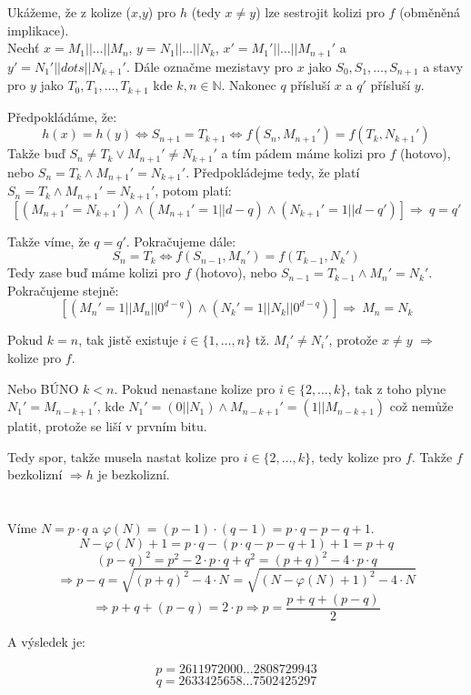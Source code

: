 \documentclass[12pt, a4paper]{article}
\begin{document}
\section{}
Ukážeme, že z kolize ($x$,$y$)  pro $h$ (tedy $x\neq y$) lze sestrojit kolizi pro $f$ (obměněná implikace).\\
Nechť $x = M_1||\dots||M_n$, $y = N_1||\dots||N_k$, $x' = M_1'||\dots||M_{n+1}'$ a $y' = N_1'||dots||N_{k+1}'$. Dále označme mezistavy pro $x$ jako $S_0, S_1, \dots, S_{n+1}$ a stavy pro $y$ jako $T_0, T_1, \dots, T_{k+1}$ kde $k,n \in \mathbb{N}$. Nakonec $q$ přísluší $x$ a $q'$ přísluší $y$. 

Předpokládáme, že: 
\[h(x)=h(y) \iff S_{n+1} = T_{k+1} \iff f(S_n, M_{n+1}') = f(T_k, N_{k+1}')\]
Takže buď $S_n \neq T_k \lor M_{n+1}' \neq N_{k+1}'$ a tím pádem máme kolizi pro $f$ (hotovo), nebo $S_n = T_k \land M_{n+1}' = N_{k+1}'$. Předpokládejme tedy, že platí $S_n = T_k \land M_{n+1}' = N_{k+1}'$, potom platí:
\[ [(M_{n+1}' = N_{k+1}') \land (M_{n+1}'=1||d-q) \land (N_{k+1}'=1||d-q')] \Rightarrow\ q=q'\]

Takže víme, že $q=q'$. Pokračujeme dále: 
\[S_n = T_k \iff f(S_{n-1}, M_n') = f(T_{k-1}, N_k')\]
Tedy zase buď máme kolizi pro $f$ (hotovo), nebo $S_{n-1} = T_{k-1} \land M_n' = N_k'$. Pokračujeme stejně:
\[[(M_n'=1||M_n||0^{d-q}) \land (N_k'=1||N_k||0^{d-q})] \Rightarrow\ M_n=N_k\]

Pokud $k=n$, tak jistě existuje $i \in \{1, \dots, n\}$ tž. $M_i' \neq N_i'$, protože $x \neq y$ $\Rightarrow$ kolize pro $f$.

Nebo BÚNO $k < n$. Pokud nenastane kolize pro $i \in \{2, \dots, k\}$, tak z toho plyne $N_1' = M_{n-k+1}'$, kde $N_1' = (0 || N_1) \land M_{n-k+1}'=(1||M_{n-k+1})$ což nemůže platit, protože se liší v prvním bitu. 

Tedy spor, takže musela nastat kolize pro $i\in\{2, \dots, k\}$, tedy kolize pro $f$. Takže $f$ bezkolizní $\Rightarrow h$ je bezkolizní.

\section{}
Víme $N = p \cdot q$ a $\varphi(N)=(p-1)\cdot(q-1)=p \cdot q - p - q + 1$.
\[N - \varphi(N) + 1 = p \cdot q - (p \cdot q - p - q + 1) + 1 = p + q \]
\[(p-q)^2 = p^2-2\cdot p \cdot q + q^2 = (p+q)^2 - 4\cdot p \cdot q \]
\[\Rightarrow p-q = \sqrt{(p+q)^2-4\cdot N} = \sqrt{(N - \varphi(N) + 1)^2 - 4\cdot N} \]
\[\Rightarrow p+q + (p-q) = 2\cdot p \Rightarrow p = \frac{p+q + (p-q)}{2}\]

A výsledek je:

\[p = 2611972000\dots 2808729943\]
\[q = 2633425658\dots 7502425297\]
\end{document}
